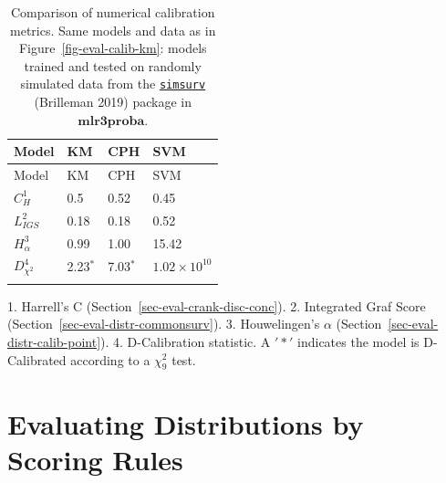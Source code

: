 \documentclass[
  letterpaper,
]{scrbook}
\theoremstyle{plain}
\theoremstyle{definition}
\theoremstyle{remark}
\begin{document}
\hypertarget{tbl-eval-calib}{}
\begin{longtable}[]{@{}llll@{}}
\toprule()
Model & KM & CPH & SVM \\
\midrule()
\endfirsthead
\toprule()
Model & KM & CPH & SVM \\
\midrule()
\endhead
\(C_H^1\) & 0.5 & 0.52 & 0.45 \\
\(L_{IGS}^2\) & 0.18 & 0.18 & 0.52 \\
\(H_\alpha^3\) & 0.99 & 1.00 & 15.42 \\
\(D_{\chi^2}^4\) & 2.23\(^*\) & 7.03\(^*\) & \(1.02\times10^{10}\) \\
\bottomrule()
\caption{\label{tbl-eval-calib}Comparison of numerical calibration
metrics. Same models and data as in Figure~\ref{fig-eval-calib-km}:
models trained and tested on randomly simulated data from the
\href{https://cran.r-project.org/package=simsurv}{\texttt{simsurv}}
(Brilleman 2019) package in \(\textbf{mlr3proba}\).}\tabularnewline
\end{longtable}

1. Harrell's C (Section~\ref{sec-eval-crank-disc-conc}). 2. Integrated
Graf Score (Section~\ref{sec-eval-distr-commonsurv}). 3. Houwelingen's
\(\alpha\) (Section~\ref{sec-eval-distr-calib-point}). 4. D-Calibration
statistic. A \('*'\) indicates the model is D-Calibrated according to a
\(\chi^2_9\) test.

\hypertarget{sec-eval-distr}{%
\section{Evaluating Distributions by Scoring
Rules}\label{sec-eval-distr}}
\end{document}
